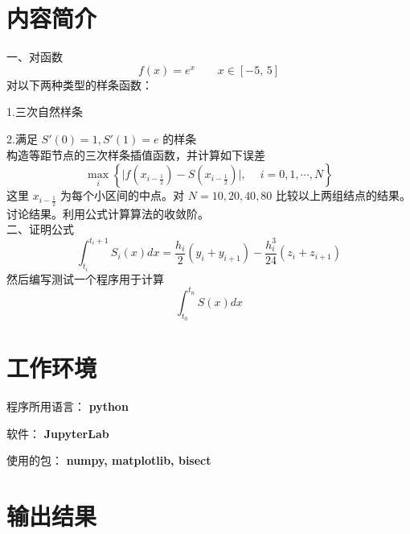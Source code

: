 \documentclass{ctexart}
\begin{document}
\section*{内容简介}
	\noindent 一、对函数
	\begin{equation}
		f(x) = e^x \qquad x\in[−5,\,5]
	\end{equation}
	对以下两种类型的样条函数：
	
	1.三次自然样条
	
	2.满足 $S'(0) = 1, S'(1) = e$ 的样条\\
	构造等距节点的三次样条插值函数，并计算如下误差
	\begin{equation}
		\max\limits_i\left\{\Big|f(x_{i − \frac{1}{2}}) − S(x_{i − \frac{1}{2}})\Big|,\quad\ i = 0, 1, \cdots, N\right\}
	\end{equation}
	这里 $x_{i − \frac{1}{2}}$ 为每个小区间的中点。对 $N = 10, 20, 40, 80$ 比较以上两组结点的结果。讨论结果。利用公式计算算法的收敛阶。\\
	
	\noindent 二、证明公式
	\begin{equation}
		\int_{t_i}^{t_i+1}S_i(x)dx = \dfrac{h_i}{2}(y_i + y_{i+1}) - \dfrac{h_i^3}{24}(z_i + z_{i+1})
	\end{equation}
	然后编写测试一个程序用于计算
	\begin{equation}
		\int_{t_0}^{t_n}S(x)dx
	\end{equation}
	
\section*{工作环境}
	程序所用语言： {\bf python}
	
	软件： {\bf JupyterLab}
	
	使用的包： {\bf numpy, matplotlib, bisect}

\section*{输出结果}
\end{document}
